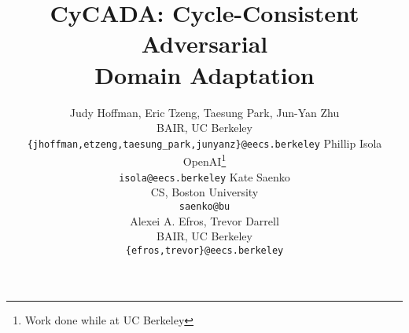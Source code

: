 \documentclass{article} %
\begin{document}
\title{CyCADA: Cycle-Consistent Adversarial\\ Domain Adaptation}

%

\author{%
	Judy Hoffman, Eric Tzeng, Taesung Park, Jun-Yan Zhu\\
	BAIR, UC Berkeley\\
	\footnotesize{\texttt{\{jhoffman,etzeng,taesung\_park,junyanz\}@eecs.berkeley}}
	\And
	Phillip Isola\\
	OpenAI\thanks{Work done while at UC Berkeley}\\
	\small{\texttt{isola@eecs.berkeley}}
	\And
	Kate Saenko\\
	CS, Boston University\\
	\small{\texttt{saenko@bu}}\\ 
	\And
	Alexei A. Efros, Trevor Darrell\\
	BAIR, UC Berkeley\\
	\small{\texttt{\{efros,trevor\}@eecs.berkeley}}
}

\maketitle











\end{document}
